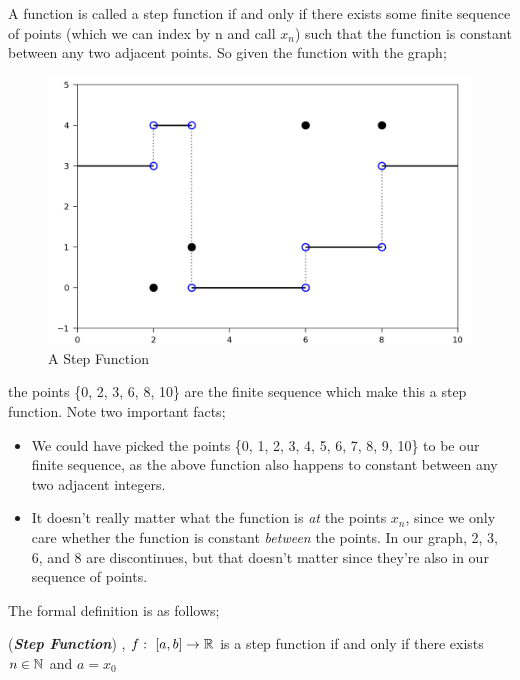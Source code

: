 A function is called a step function if and only if there exists some finite sequence of points (which we can index by n and call $x_n$) such that the function is constant between any two adjacent points. So given the function with the graph;
\begin{figure}[H]
	\centering
	\includegraphics{Code/Step.png}
	\caption{A Step Function}
\end{figure}
the points \{0, 2, 3, 6, 8, 10\} are the finite sequence which make this a step function. Note two important facts;
\begin{itemize}
	\item We could have picked the points \{0, 1, 2, 3, 4, 5, 6, 7, 8, 9, 10\} to be our finite sequence, as the above function also happens to constant between any two adjacent integers. 
	\item It doesn't really matter what the function is {\em at} the points $x_n$, since we only care whether the function is constant {\em between} the points. In our graph, 2, 3, 6, and 8 are discontinues, but that doesn't matter since they're also in our sequence of points. 
\end{itemize}

The formal definition is as follows;
\begin{definition}{{(\bf\em Step Function\/})}
, $f: \ [a, b] \rightarrow \mathbb{R}$ is a step function if and only if there exists $n \in  \mathbb{N}$ and $a = x_0$
\end{definition}



